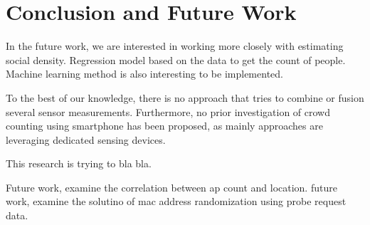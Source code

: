 \chapter{Conclusion and Future Work}
\label{ch:conclusion-future-work} %
In the future work, we are interested in working more closely with estimating social density. Regression model based on the data to get the count of people. Machine learning method is also interesting to be implemented.

To the best of our knowledge, there is no approach that tries to combine or fusion several sensor measurements. Furthermore, no prior investigation of crowd counting using smartphone has been proposed, as mainly approaches are leveraging dedicated sensing devices.

This research is trying to bla bla.

Future work, examine the correlation between ap count and location.
future work, examine the solutino of mac address randomization using probe request data.
